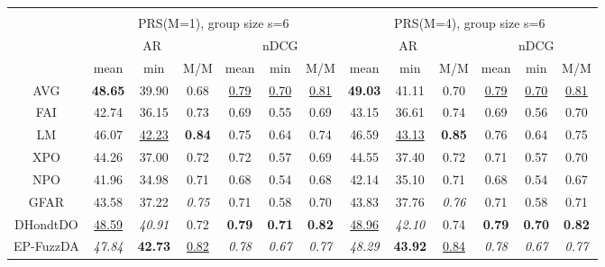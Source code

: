 \begin{tabular}{ c | c c c | c c c || c c c | c c c}
\multicolumn{12}{c}{} \\
\multicolumn{1}{c}{} & \multicolumn{6}{c}{PRS(M=1), group size s=6} & \multicolumn{6}{c}{PRS(M=4), group size s=6} \\
\multicolumn{1}{c}{} & \multicolumn{3}{c}{AR} & \multicolumn{3}{c}{nDCG} & \multicolumn{3}{c}{AR} & \multicolumn{3}{c}{nDCG} \\
& mean & min & M/M & mean & min & M/M & mean & min & M/M & mean & min & M/M \\
\hline
AVG & \textbf{48.65} & 39.90 & 0.68 & \underline{0.79} & \underline{0.70} & \underline{0.81} & \textbf{49.03} & 41.11 & 0.70 & \underline{0.79} & \underline{0.70} & \underline{0.81} \\
FAI & 42.74 & 36.15 & 0.73 & 0.69 & 0.55 & 0.69 & 43.15 & 36.61 & 0.74 & 0.69 & 0.56 & 0.70 \\
LM & 46.07 & \underline{42.23} & \textbf{0.84} & 0.75 & 0.64 & 0.74 & 46.59 & \underline{43.13} & \textbf{0.85} & 0.76 & 0.64 & 0.75 \\
XPO & 44.26 & 37.00 & 0.72 & 0.72 & 0.57 & 0.69 & 44.55 & 37.40 & 0.72 & 0.71 & 0.57 & 0.70 \\
NPO & 41.96 & 34.98 & 0.71 & 0.68 & 0.54 & 0.68 & 42.14 & 35.10 & 0.71 & 0.68 & 0.54 & 0.67 \\
GFAR & 43.58 & 37.22 & \textit{0.75} & 0.71 & 0.58 & 0.70 & 43.83 & 37.76 & \textit{0.76} & 0.71 & 0.58 & 0.71 \\
DHondtDO & \underline{48.59} & \textit{40.91} & 0.72 & \textbf{0.79} & \textbf{0.71} & \textbf{0.82} & \underline{48.96} & \textit{42.10} & 0.74 & \textbf{0.79} & \textbf{0.70} & \textbf{0.82} \\
EP-FuzzDA & \textit{47.84} & \textbf{42.73} & \underline{0.82} & \textit{0.78} & \textit{0.67} & \textit{0.77} & \textit{48.29} & \textbf{43.92} & \underline{0.84} & \textit{0.78} & \textit{0.67} & \textit{0.77} \\


\end{tabular}
